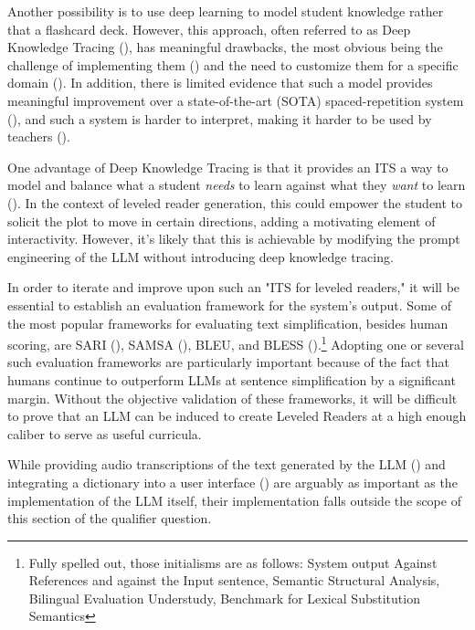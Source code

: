 \documentclass[
	letterpaper, %
]{jdf}
\newcommand{\pcite}[1]{(\cite{#1})}
\begin{document}
Another possibility is to use deep learning to model student knowledge rather that a flashcard deck. However, this approach, often referred to as Deep Knowledge Tracing \pcite{deep_knowledge_tracing}, has meaningful drawbacks, the most obvious being the challenge of implementing them \pcite{question_generation_adaptive_education, generative_information_retrieval} and the need to customize them for a specific domain \pcite{dkt_knowledge_tracing}. In addition, there is limited evidence that such a model provides meaningful improvement over a state-of-the-art (SOTA) spaced-repetition system \pcite{flashcard_scheduler_evolution}, and such a system is harder to interpret, making it harder to be used by teachers \pcite{deep_learning_knowledge_tracing}.

One advantage of Deep Knowledge Tracing is that it provides an ITS a way to model and balance what a student \textit{needs} to learn against what they \textit{want} to learn \pcite{llm_augmented_exercise_retrieval}. In the context of leveled reader generation, this could empower the student to solicit the plot to move in certain directions, adding a motivating element of interactivity. However, it's likely that this is achievable by modifying the prompt engineering of the LLM without introducing deep knowledge tracing.

In order to iterate and improve upon such an "ITS for leveled readers," it will be essential to establish an evaluation framework for the system's output. Some of the most popular frameworks for evaluating text simplification, besides human scoring, are SARI \pcite{xu-etal-2016-optimizing}, SAMSA \pcite{sulem-etal-2018-semantic}, BLEU, and BLESS \pcite{kew2023bless}.\footnote{Fully spelled out, those initialisms are as follows: System output Against References and against the Input sentence, Semantic Structural Analysis, Bilingual Evaluation Understudy, Benchmark for Lexical Substitution Semantics} Adopting one or several such evaluation frameworks are particularly important because of the fact that humans continue to outperform LLMs at sentence simplification by a significant margin. Without the objective validation of these frameworks, it will be difficult to prove that an LLM can be induced to create Leveled Readers at a high enough caliber to serve as useful curricula.

While providing audio transcriptions of the text generated by the LLM \pcite{Chang2015ImprovingRR} and integrating a dictionary into a user interface \pcite{mcdonald2016} are arguably as important as the implementation of the LLM itself, their implementation falls outside the scope of this section of the qualifier question.

\printbibliography{}
\end{document}
